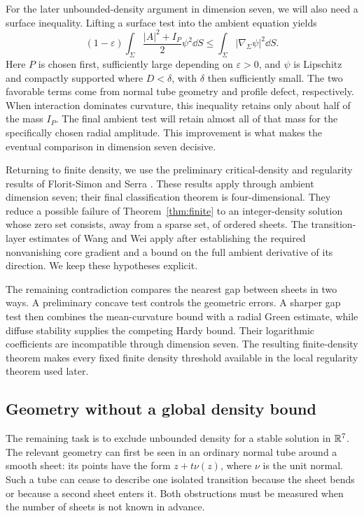 For the later unbounded-density argument in dimension seven, we will also need a surface inequality. Lifting a surface test into the ambient equation yields
\begin{equation}\label{eq:intro-surface-stability}
 (1-\varepsilon)\int_\Sigma
       \frac{|A|^2+I_P}{2}\psi^2\dd S
 \le \int_\Sigma|\nabla_\Sigma\psi|^2\dd S.
\end{equation}
Here $P$ is chosen first, sufficiently large depending on
$\varepsilon>0$, and $\psi$ is Lipschitz and compactly supported
where $D<\delta$, with $\delta$ then sufficiently small.
The two favorable terms come from normal tube geometry and profile
defect, respectively.  When interaction dominates curvature, this
inequality retains only about half of the mass $I_P$.
The final ambient test will retain almost all of that mass for
the specifically chosen radial amplitude.  This improvement is what makes
the eventual comparison in dimension seven decisive.

Returning to finite density, we use the preliminary critical-density and regularity results of Florit-Simon and Serra \cite[Sections~3--5]{FSS2025}.
These results apply through ambient dimension seven; their final
classification theorem is four-dimensional.
They reduce a possible failure of Theorem~\ref{thm:finite} to
an integer-density solution whose zero set consists, away from a
sparse set, of ordered sheets.
The transition-layer estimates of Wang and Wei
\cite{WangWei2019} apply after establishing the required
nonvanishing core gradient and a bound on the full ambient
derivative of its direction.
We keep these hypotheses explicit.

The remaining contradiction compares the nearest gap between
sheets in two ways.  A preliminary concave test controls the
geometric errors.  A sharper gap test then combines the
mean-curvature bound with a radial Green estimate, while diffuse
stability supplies the competing Hardy bound.
Their logarithmic coefficients are incompatible through
dimension seven.  The resulting finite-density theorem makes
every fixed finite density threshold available in the local
regularity theorem used later.

\subsection{Geometry without a global density bound}

The remaining task is to exclude unbounded density for a stable
solution in $\mathbb R^7$.
The relevant geometry can first be seen in an ordinary normal
tube around a smooth sheet: its points have the form
$z+t\nu(z)$, where $\nu$ is the unit normal.
Such a tube can cease to describe one isolated transition because
the sheet bends or because a second sheet enters it.
Both obstructions must be measured when the number of sheets
is not known in advance.

